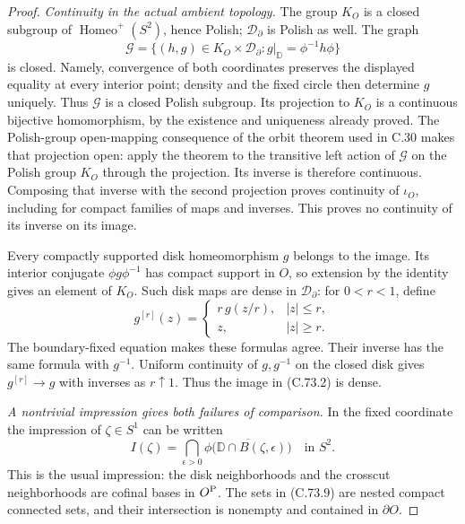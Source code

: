 \begin{proof}
\emph{Continuity in the actual ambient topology.}
The group $K_O$ is a closed subgroup of
$\operatorname{Homeo}^+(S^2)$, hence Polish;
$\mathcal D_\partial$ is Polish as well.
The graph
\[
       \mathcal G=
       \{(h,g)\in K_O\times\mathcal D_\partial:
                       g|_{\mathbb D}=\phi^{-1}h\phi\}
                                                               \tag{C.73.7}
\]
is closed. Namely, convergence of both coordinates
preserves the displayed equality at every interior
point; density and the fixed circle then determine
$g$ uniquely. Thus $\mathcal G$ is a closed
Polish subgroup. Its projection to $K_O$ is a
continuous bijective homomorphism, by the existence
and uniqueness already proved. The Polish-group
open-mapping consequence of the orbit theorem
used in C.30 makes that projection open: apply
the theorem to the transitive left action of
$\mathcal G$ on the Polish group $K_O$ through
the projection. Its inverse is therefore
continuous. Composing that inverse with the
second projection proves continuity of $\iota_O$,
including for compact families of maps and
inverses. This proves no continuity of its
inverse on its image.

Every compactly supported disk homeomorphism
$g$ belongs to the image. Its interior conjugate
$\phi g\phi^{-1}$ has compact support in $O$,
so extension by the identity gives an element
of $K_O$. Such disk maps are dense in
$\mathcal D_\partial$: for $0<r<1$, define
\[
 g^{[r]}(z)=
 \begin{cases}
      r\,g(z/r),& |z|\leq r,\\
      z,& |z|\geq r .
 \end{cases}                                                   \tag{C.73.8}
\]
The boundary-fixed equation makes these formulas
agree. Their inverse has the same formula with
$g^{-1}$. Uniform continuity of $g,g^{-1}$
on the closed disk gives
$g^{[r]}\to g$ with inverses as $r\uparrow1$.
Thus the image in (C.73.2) is dense.

\emph{A nontrivial impression gives both failures of comparison.}
In the fixed coordinate the impression of
$\zeta\in S^1$ can be written
\[
 I(\zeta)=\bigcap_{\epsilon>0}
       \overline{\phi\bigl(\mathbb D\cap
                                  B(\zeta,\epsilon)\bigr)}
                       \quad\text{in }S^2 .
                                                               \tag{C.73.9}
\]
This is the usual impression: the disk
neighborhoods and the crosscut neighborhoods
are cofinal bases in $O^{\rm P}$.
The sets in (C.73.9) are nested compact
connected sets, and their intersection is
nonempty and contained in $\partial O$.


\end{proof}
